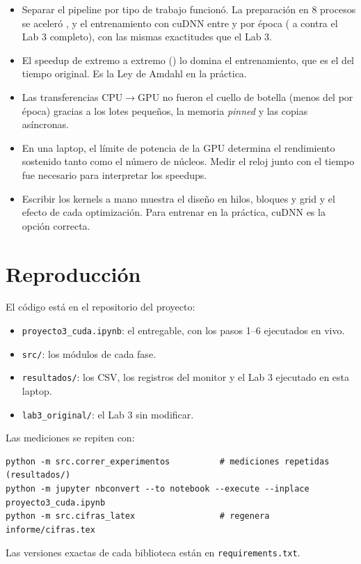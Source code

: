 \documentclass[11pt,letterpaper]{article}
\newcommand{\cod}[1]{\texttt{#1}}
\begin{document}
\begin{itemize}
  \item Separar el pipeline por tipo de trabajo funcionó. La preparación en 8 procesos se aceleró \PrepSpeedup, y el entrenamiento con cuDNN entre \SpeedupMin{} y \SpeedupMax{} por época (\SpeedupBaseLab{} a \SpeedupProfundaLab{} contra el Lab 3 completo), con las mismas exactitudes que el Lab 3.
  \item El speedup de extremo a extremo (\SpeedupTotal) lo domina el entrenamiento, que es el \FraccionEntrenamiento{} del tiempo original. Es la Ley de Amdahl en la práctica.
  \item Las transferencias CPU$\rightarrow$GPU no fueron el cuello de botella (menos del \TransfMaxPct{} por época) gracias a los lotes pequeños, la memoria \textit{pinned} y las copias asíncronas.
  \item En una laptop, el límite de potencia de la GPU determina el rendimiento sostenido tanto como el número de núcleos. Medir el reloj junto con el tiempo fue necesario para interpretar los speedups.
  \item Escribir los kernels a mano muestra el diseño en hilos, bloques y grid y el efecto de cada optimización. Para entrenar en la práctica, cuDNN es la opción correcta.
\end{itemize}

\appendix
\section{Reproducción}

El código está en el repositorio del proyecto:
\begin{itemize}
  \item \cod{proyecto3\_cuda.ipynb}: el entregable, con los pasos 1--6 ejecutados en vivo.
  \item \cod{src/}: los módulos de cada fase.
  \item \cod{resultados/}: los CSV, los registros del monitor y el Lab 3 ejecutado en esta laptop.
  \item \cod{lab3\_original/}: el Lab 3 sin modificar.
\end{itemize}

Las mediciones se repiten con:
\begin{verbatim}
python -m src.correr_experimentos          # mediciones repetidas (resultados/)
python -m jupyter nbconvert --to notebook --execute --inplace proyecto3_cuda.ipynb
python -m src.cifras_latex                 # regenera informe/cifras.tex
\end{verbatim}
Las versiones exactas de cada biblioteca están en \cod{requirements.txt}.
\end{document}
